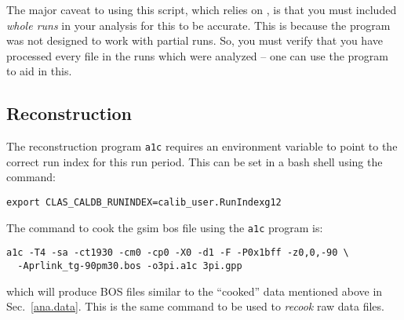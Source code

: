 The major caveat to using this script, which relies on , is that you must included \emph{whole runs} in your analysis for this to be accurate. This is because the  program was not designed to work with partial runs. So, you must verify that you have processed every file in the runs which were analyzed -- one can use the  program to aid in this.


\FloatBarrier

\subsection{Reconstruction}

The reconstruction program \texttt{a1c} requires an environment variable to point to the correct run index for this run period. This can be set in a bash shell using the command:
\begin{verbatim}
export CLAS_CALDB_RUNINDEX=calib_user.RunIndexg12
\end{verbatim}
The command to cook the gsim bos file using the \texttt{a1c} program is:
\begin{verbatim}
a1c -T4 -sa -ct1930 -cm0 -cp0 -X0 -d1 -F -P0x1bff -z0,0,-90 \
  -Aprlink_tg-90pm30.bos -o3pi.a1c 3pi.gpp
\end{verbatim}
which will produce BOS files similar to the ``cooked'' data mentioned above in Sec.~\ref{ana.data}. This is the same command to be used to \emph{recook} raw data files.

\FloatBarrier



